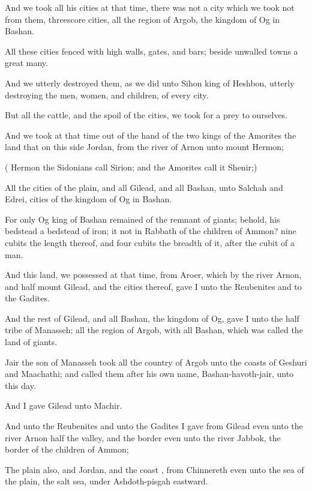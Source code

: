 {And we
took all his
cities at that
time, there was not a
city which we
took not from them,
threescore
cities, all the
region of
Argob, the
kingdom of
Og in
Bashan.

All these
cities
{}
fenced with
high
walls,
gates, and
bars; beside
unwalled
towns a
great
many.

And we utterly
destroyed them, as we
did unto
Sihon
king of
Heshbon, utterly
destroying the
men,
women, and
children, of every
city.

But all the
cattle, and the
spoil of the
cities, we took for a
prey to ourselves.

And we
took at that
time
out of the
hand of the
two
kings of the
Amorites the
land that
{} on this
side
Jordan, from the
river of
Arnon unto
mount
Hermon;

({}
Hermon the
Sidonians
call
Sirion; and the
Amorites
call it
Shenir;)

All the
cities of the
plain, and all
Gilead, and all
Bashan, unto
Salchah and
Edrei,
cities of the
kingdom of
Og in
Bashan.

For only
Og
king of
Bashan
remained of the
remnant of
giants; behold, his
bedstead
{} a
bedstead of
iron;
{} it
not in
Rabbath of the
children of
Ammon?
nine
cubits
{} the
length thereof, and
four
cubits the
breadth of it, after the
cubit of a
man.


\par }{\PP {}And this
land,
{} we
possessed at that
time, from
Aroer, which
{} by the
river
Arnon, and
half
mount
Gilead, and the
cities thereof,
gave I unto the
Reubenites and to the
Gadites.

And the
rest of
Gilead, and all
Bashan,
{} the
kingdom of
Og,
gave I unto the
half
tribe of
Manasseh; all the
region of
Argob, with all
Bashan,
which was
called the
land of
giants.

Jair the
son of
Manasseh
took all the
country of
Argob unto the
coasts of
Geshuri and
Maachathi; and
called them after his own
name,
Bashan-havoth-jair, unto this
day.

And I
gave
Gilead unto
Machir.

And unto the
Reubenites and unto the
Gadites I
gave from
Gilead even unto the
river
Arnon
half the
valley, and the
border even unto the
river
Jabbok,
{} the
border of the
children of
Ammon;

The
plain also, and
Jordan, and the
coast
{}, from
Chinnereth even unto the
sea of the
plain,
{} the
salt
sea, under
Ashdoth-pisgah
eastward.


}
